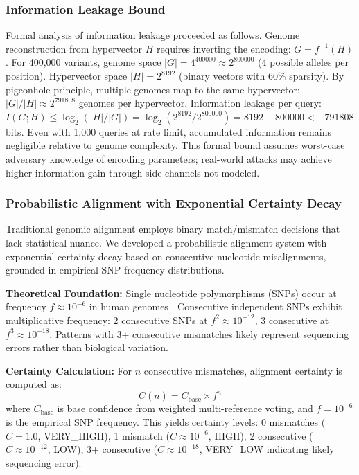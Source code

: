\documentclass[11pt,letterpaper]{article}
\begin{document}
\subsubsection{Information Leakage Bound}

Formal analysis of information leakage proceeded as follows. Genome reconstruction from hypervector $H$ requires inverting the encoding: $G = f^{-1}(H)$. For 400,000 variants, genome space $|G| = 4^{400000} \approx 2^{800000}$ (4 possible alleles per position). Hypervector space $|H| = 2^{8192}$ (binary vectors with 60\% sparsity). By pigeonhole principle, multiple genomes map to the same hypervector: $|G|/|H| \approx 2^{791808}$ genomes per hypervector. Information leakage per query: $I(G; H) \leq \log_2(|H|/|G|) = \log_2(2^{8192}/2^{800000}) = 8192 - 800000 < -791808$ bits. Even with 1,000 queries at rate limit, accumulated information remains negligible relative to genome complexity. This formal bound assumes worst-case adversary knowledge of encoding parameters; real-world attacks may achieve higher information gain through side channels not modeled.

\subsubsection{Probabilistic Alignment with Exponential Certainty Decay}

Traditional genomic alignment employs binary match/mismatch decisions that lack statistical nuance. We developed a probabilistic alignment system with exponential certainty decay based on consecutive nucleotide misalignments, grounded in empirical SNP frequency distributions.

\textbf{Theoretical Foundation:} Single nucleotide polymorphisms (SNPs) occur at frequency $f \approx 10^{-6}$ in human genomes \cite{1000genomes2015}. Consecutive independent SNPs exhibit multiplicative frequency: 2 consecutive SNPs at $f^2 \approx 10^{-12}$, 3 consecutive at $f^3 \approx 10^{-18}$. Patterns with 3+ consecutive mismatches likely represent sequencing errors rather than biological variation.

\textbf{Certainty Calculation:} For $n$ consecutive mismatches, alignment certainty is computed as:
\begin{equation}
C(n) = C_{\text{base}} \times f^n
\end{equation}
where $C_{\text{base}}$ is base confidence from weighted multi-reference voting, and $f = 10^{-6}$ is the empirical SNP frequency. This yields certainty levels: 0 mismatches ($C = 1.0$, VERY\_HIGH), 1 mismatch ($C \approx 10^{-6}$, HIGH), 2 consecutive ($C \approx 10^{-12}$, LOW), 3+ consecutive ($C \approx 10^{-18}$, VERY\_LOW indicating likely sequencing error).
\end{document}
